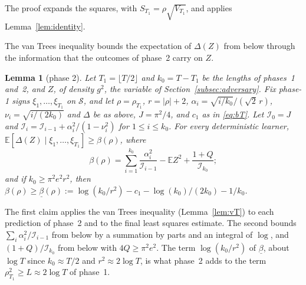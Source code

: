 \documentclass[12pt]{amsart}
\newtheorem{lemma}[theorem]{Lemma}
\theoremstyle{definition}
\numberwithin{equation}{section}
\newcommand{\E}{\mathbb{E}}
\newcommand{\Info}{\mathcal{I}}
\newcommand{\Succ}{\mathcal{S}}
\newcommand{\leanmap}[1]{\ignorespaces}
\newcommand{\mapnote}[1]{\ignorespaces}
\begin{document}
The proof expands the squares, with $S_{T_1}=\rho\sqrt{V_{T_1}}$, and applies Lemma~\ref{lem:identity}.

The van Trees inequality bounds the expectation of $\Delta(Z)$ from below through the information that the outcomes of phase~2 carry on $Z$.

\begin{lemma}[phase 2]\label{lem:phase2}
\leanmap{RegretKappa.LowerSharp.phase2S, RegretKappa.LowerSharp.beta_ge}
\mapnote{Lean proves the first claim for every radius $r\ge|\rho|+2$; in part (iv) of the proof it bounds $\sum_{1\le i<k_0}\log(i/k_0)$ through $k_0^{k_0}/k_0!\le e^{k_0}$ in place of the integral of $\log$.}
Let $T_1=\lfloor T/2\rfloor$ and $k_0=T-T_1$ be the lengths of phases~1 and~2, and $Z$, of density $g^2$, the variable of Section~\ref{subsec:adversary}. Fix phase-1 signs $\xi_1,\dots,\xi_{T_1}$ on $\Succ$, and let $\rho=\rho_{T_1}$, $r=|\rho|+2$, $\alpha_i=\sqrt{i/k_0}/(\sqrt2\,r)$, $\nu_i=\sqrt{i/(2k_0)}$ and $\Delta$ be as above, $J=\pi^2/4$, and $c_1$ as in \eqref{eq:bT}. Let $\Info_0=J$ and $\Info_i=\Info_{i-1}+\alpha_i^2/(1-\nu_i^2)$ for $1\le i\le k_0$. For every deterministic learner, $\E[\Delta(Z)\mid\xi_1,\dots,\xi_{T_1}]\ge\beta(\rho)$, where
\[
\beta(\rho)=\sum_{i=1}^{k_0}\frac{\alpha_i^2}{\Info_{i-1}}-\E Z^2+\frac{1+Q}{\Info_{k_0}};
\]
and if $k_0\ge\pi^2e^2r^2$, then $\beta(\rho)\ge\underline\beta(\rho):=\log(k_0/r^2)-c_1-\log(k_0)/(2k_0)-1/k_0$.
\end{lemma}

The first claim applies the van Trees inequality (Lemma~\ref{lem:vT}) to each prediction of phase~2 and to the final least squares estimate. The second bounds $\sum_i\alpha_i^2/\Info_{i-1}$ from below by a summation by parts and an integral of $\log$, and $(1+Q)/\Info_{k_0}$ from below with $4Q\ge\pi^2e^2$. The term $\log(k_0/r^2)$ of $\underline\beta$, about $\log T$ since $k_0\approx T/2$ and $r^2\approx2\log T$, is what phase~2 adds to the term $\rho_{T_1}^2\ge L\approx2\log T$ of phase~1.
\end{document}
